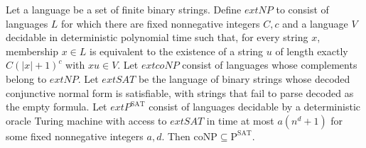 \begin{theorem}
\label{Complexity.coNP_subset_POracle_SAT}
\leanok
{}
Let a language be a set of finite binary strings. Define $	ext{NP}$ to consist of
languages $L$ for which there are fixed nonnegative integers $C,c$ and a language $V$
decidable in deterministic polynomial time such that, for every string $x$, membership
$x\in L$ is equivalent to the existence of a string $u$ of length exactly $C(|x|+1)^c$
with $xu\in V$. Let $	ext{coNP}$ consist of languages whose complements belong to
$	ext{NP}$. Let $	ext{SAT}$ be the language of binary strings whose decoded conjunctive
normal form is satisfiable, with strings that fail to parse decoded as the empty
formula. Let $	ext{P}^{\text{SAT}}$ consist of languages decidable by a deterministic
oracle Turing machine with access to $	ext{SAT}$ in time at most $a(n^d+1)$ for some
fixed nonnegative integers $a,d$. Then $\text{coNP}\subseteq\text{P}^{\text{SAT}}$.
\end{theorem}
